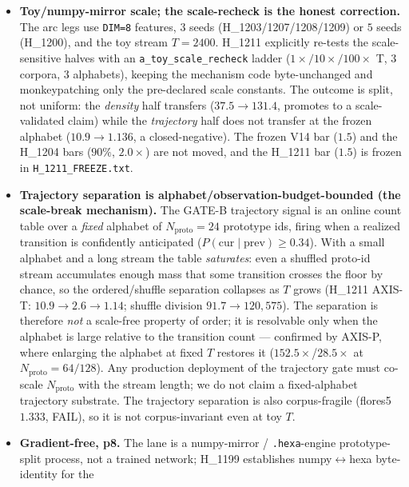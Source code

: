 \documentclass[11pt,a4paper]{article}
\begin{document}
\begin{itemize}\itemsep0.3em
\item \textbf{Toy/numpy-mirror scale; the scale-recheck is the honest
      correction.} The arc legs use \verb|DIM=8| features, $3$ seeds
      (H\_1203/1207/1208/1209) or $5$ seeds (H\_1200), and the toy stream
      $T{=}2400$. H\_1211 explicitly re-tests the scale-sensitive halves with an
      \verb|a_toy_scale_recheck| ladder ($1\!\times\!/10\!\times\!/100\times$ T,
      $3$ corpora, $3$ alphabets), keeping the mechanism code byte-unchanged and
      monkeypatching only the pre-declared scale constants. The outcome is split,
      not uniform: the \emph{density} half transfers ($37.5 \to 131.4$, promotes
      to a scale-validated claim) while the \emph{trajectory} half does not
      transfer at the frozen alphabet ($10.9 \to 1.136$, a closed-negative). The
      frozen V14 bar ($1.5$) and the H\_1204 bars ($90\%$, $2.0\times$) are not
      moved, and the H\_1211 bar ($1.5$) is frozen in \verb|H_1211_FREEZE.txt|.
\item \textbf{Trajectory separation is alphabet/observation-budget-bounded
      (the scale-break mechanism).} The GATE-B trajectory signal is an online
      count table over a \emph{fixed} alphabet of $N_{\text{proto}}{=}24$
      prototype ids, firing when a realized transition is confidently anticipated
      ($P(\text{cur}\mid\text{prev}) \ge 0.34$). With a small alphabet and a long
      stream the table \emph{saturates}: even a shuffled proto-id stream
      accumulates enough mass that some transition crosses the floor by chance,
      so the ordered/shuffle separation collapses as $T$ grows (H\_1211 AXIS-T:
      $10.9 \to 2.6 \to 1.14$; shuffle division $91.7 \to 120{,}575$). The
      separation is therefore \emph{not} a scale-free property of order; it is
      resolvable only when the alphabet is large relative to the transition count
      --- confirmed by AXIS-P, where enlarging the alphabet at fixed $T$ restores
      it ($152.5\times$/$28.5\times$ at $N_{\text{proto}}{=}64/128$). Any
      production deployment of the trajectory gate must co-scale
      $N_{\text{proto}}$ with the stream length; we do not claim a fixed-alphabet
      trajectory substrate. The trajectory separation is also corpus-fragile
      (flores5 $1.333$, FAIL), so it is not corpus-invariant even at toy $T$.
\item \textbf{Gradient-free, p8.} The lane is a numpy-mirror /
      \texttt{.hexa}-engine prototype-split process, not a trained network;
      H\_1199 establishes numpy$\leftrightarrow$hexa byte-identity for the

\end{itemize}
\end{document}
